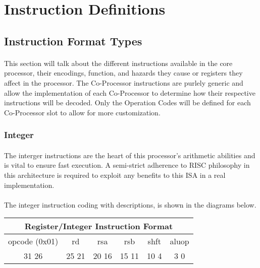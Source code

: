\documentclass[letterpaper, 11pt]{article}
\begin{document}
\section{Instruction Definitions}
\subsection{Instruction Format Types}
\paragraph{}This section will talk about the different instructions available in the core processor, their encodings, function, and hazards
they cause or registers they affect in the processor. The Co-Processor instructions are purlely generic and allow the implementation of
each Co-Processor to determine how their respective instructions will be decoded. Only the Operation Codes will be defined for each 
Co-Processor slot to allow for more customization.

\newpage
\subsubsection{Integer}
\paragraph{}The interger instructions are the heart of this processor's arithmetic abilities and is vital to ensure fast execution. A semi-strict
adherence to RISC philosophy in this architecture is required to exploit any benefits to this ISA in a real implementation.
\paragraph{}The integer instruction coding with descriptions, is shown in the diagrams below.

\begin{center}
		\begin{tabular}{|c|c|c|c|c|c|}
			\multicolumn{6}{c}{Register/Integer Instruction Format}\\ \hline
				\hspace{2pt} opcode (0x01) \hspace{2pt} & \hspace{5pt} rd \hspace{5pt} &  \hspace{4pt} rsa \hspace{4pt} & \hspace{4pt}rsb  \hspace{4pt}& \hspace{10pt}shft  \hspace{10pt} & \hspace{3pt} aluop \hspace{3pt}   \\	\hline
			31 \hfill 26& 25 \hfill 21 &20 \hfill  16& 15 \hfill  11&10 \hfill   4&3 \hfill   0\\ \hline
		
	\end{tabular}
\end{center}	
\end{document}
